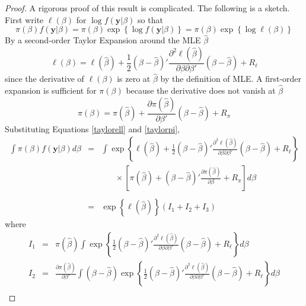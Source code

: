 \documentclass[12pt]{article}
\theoremstyle{definition}
\begin{document}
\begin{proof}
A rigorous proof of this result is complicated. The following is a sketch. First write $\ell(\beta)$ for $\log{f(\mathbf{y}|\beta)}$ so that 
$$\pi(\beta)f(\mathbf{y}|\beta) = \pi(\beta) \exp{\left\{ \log{f(\mathbf{y}| \beta)} \right\}}=\pi(\beta) \exp{\left\{ \log{\ell(\beta)} \right\}}$$
By a second-order Taylor Expansion around the MLE $\hat{\beta}$
	\begin{equation}
	\label{taylorell}
		\ell(\beta) = \ell(\hat{\beta}) +\frac{1}{2} \left( \beta - \hat{\beta}  \right)' \frac{\partial^2 \ell(\hat{\beta})}{\partial \beta \partial \beta'} \left( \beta - \hat{\beta}  \right) + R_\ell
	\end{equation}
since the derivative of $\ell(\beta)$ is zero at $\hat{\beta}$ by the definition of MLE. A first-order expansion is sufficient for $\pi(\beta)$ because the derivative does not vanish at $\hat{\beta}$
	\begin{equation}
		\label{taylorpi}
		\pi(\beta) = \pi(\hat{\beta}) +  \frac{\partial \pi(\hat{\beta})}{\partial \beta'} \left(\beta - \hat{\beta}  \right)+ R_\pi
	\end{equation}
Substituting Equations \ref{taylorell} and \ref{taylorpi},
	\begin{eqnarray*}
		\int \pi(\beta)f(\mathbf{y}|\beta)d\beta &=& \int \exp\left\{ \ell(\hat{\beta}) +\frac{1}{2} \left( \beta - \hat{\beta}  \right)' \frac{\partial^2 \ell(\hat{\beta})}{\partial \beta \partial \beta'} \left( \beta - \hat{\beta}  \right) + R_\ell \right\}\\
		&&\;\;\;\;\;\;\times \left[ \pi(\hat{\beta}) + \left(\beta - \hat{\beta}  \right)' \frac{\partial \pi(\hat{\beta})}{\partial \beta} + R_\pi \right]  d\beta\\\\
		&=& \exp\left\{ \ell(\hat{\beta}) \right\} (I_1 + I_2 + I_3)
	\end{eqnarray*}
where
	\begin{eqnarray*}
		I_1 &=& \pi(\hat{\beta}) \int  \exp{\left\{ \frac{1}{2} \left( \beta - \hat{\beta}  \right)' \frac{\partial^2 \ell(\hat{\beta})}{\partial \beta \partial \beta'} \left( \beta - \hat{\beta}  \right) + R_\ell\right\}} d\beta\\
		I_2 &=& \frac{\partial \pi(\hat{\beta})}{\partial \beta'}   \int  \left(\beta - \hat{\beta}  \right) \exp{\left\{ \frac{1}{2} \left( \beta - \hat{\beta}  \right)' \frac{\partial^2 \ell(\hat{\beta})}{\partial \beta \partial \beta'} \left( \beta - \hat{\beta}  \right) + R_\ell\right\}} d\beta\\

\end{eqnarray*}
\end{proof}
\end{document}
